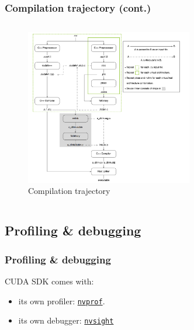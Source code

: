 \begin{frame}
   \frametitle{Compilation trajectory (cont.)}
      \begin{columns}
           \begin{figure}[H]
              \centering
              \includegraphics[width=0.65\textwidth]{./img/compileTrajectory.png}
	      \caption{\small{Compilation trajectory}}
           \end{figure}
        \end{columns}
\end{frame}     

\subsection{Profiling \& debugging}
\begin{frame}
   \frametitle{Profiling \& debugging} 
      CUDA SDK comes with:
      \begin{itemize}	
         \item its own profiler: \href{https://docs.nvidia.com/cuda/profiler-users-guide/}{\texttt{nvprof}}.  
	 \item its own debugger: \href{https://docs.nvidia.com/nsight-visual-studio-edition/cuda-debugger/}{\texttt{nvsight}}
      \end{itemize}		 
\end{frame}

